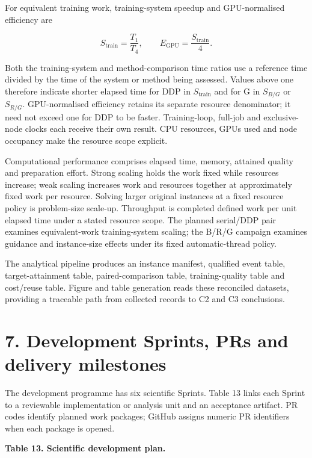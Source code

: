 \documentclass[
  british,
  10pt,
]{article}
\begin{document}
For equivalent training work, training-system speedup and GPU-normalised
efficiency are

\[
S_{\mathrm{train}}=\frac{T_{1}}{T_{4}},\qquad
E_{\mathrm{GPU}}=\frac{S_{\mathrm{train}}}{4}.
\tag{8}
\]

Both the training-system and method-comparison time ratios use a
reference time divided by the time of the system or method being
assessed. Values above one therefore indicate shorter elapsed time for
DDP in \(S_{\mathrm{train}}\) and for G in \(S_{B/G}\) or \(S_{R/G}\).
GPU-normalised efficiency retains its separate resource denominator; it
need not exceed one for DDP to be faster. Training-loop, full-job and
exclusive-node clocks each receive their own result. CPU resources, GPUs
used and node occupancy make the resource scope explicit.

Computational performance comprises elapsed time, memory, attained
quality and preparation effort. Strong scaling holds the work fixed
while resources increase; weak scaling increases work and resources
together at approximately fixed work per resource. Solving larger
original instances at a fixed resource policy is problem-size scale-up.
Throughput is completed defined work per unit elapsed time under a
stated resource scope. The planned serial/DDP pair examines
equivalent-work training-system scaling; the B/R/G campaign examines
guidance and instance-size effects under its fixed automatic-thread
policy.

The analytical pipeline produces an instance manifest, qualified event
table, target-attainment table, paired-comparison table,
training-quality table and cost/reuse table. Figure and table generation
reads these reconciled datasets, providing a traceable path from
collected records to C2 and C3 conclusions.

\section{7. Development Sprints, PRs and delivery
milestones}\label{development-sprints-prs-and-delivery-milestones}

The development programme has six scientific Sprints. Table 13 links
each Sprint to a reviewable implementation or analysis unit and an
acceptance artifact. PR codes identify planned work packages; GitHub
assigns numeric PR identifiers when each package is opened.


\textbf{Table 13. Scientific development plan.}
\end{document}
